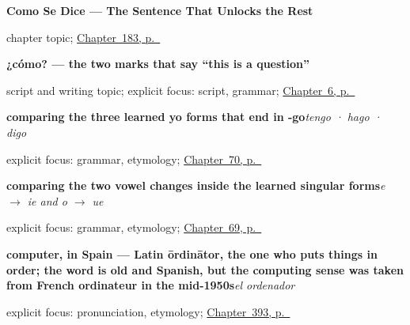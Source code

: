 \noindent\begin{minipage}[t]{\linewidth}
\raggedright
\textbf{Como Se Dice --- The Sentence That Unlocks the Rest}\par
\footnotesize chapter topic; \hyperref[ch:como-se-dice]{Chapter~183, p.~\pageref*{ch:como-se-dice}}
\end{minipage}\par\smallskip

\noindent\begin{minipage}[t]{\linewidth}
\raggedright
\textbf{¿cómo? — the two marks that say \textquotedblleft{}this is a question\textquotedblright{}}\par
\footnotesize script and writing topic; explicit focus: script, grammar; \hyperref[ch:asking-a-name]{Chapter~6, p.~\pageref*{ch:asking-a-name}}
\end{minipage}\par\smallskip

\noindent\begin{minipage}[t]{\linewidth}
\raggedright
\textbf{comparing the three learned yo forms that end in -go}\enspace\emph{tengo · hago · digo}\par
\footnotesize explicit focus: grammar, etymology; \hyperref[ch:yo-go-verbs]{Chapter~70, p.~\pageref*{ch:yo-go-verbs}}
\end{minipage}\par\smallskip

\noindent\begin{minipage}[t]{\linewidth}
\raggedright
\textbf{comparing the two vowel changes inside the learned singular forms}\enspace\emph{e $\to$ ie and o $\to$ ue}\par
\footnotesize explicit focus: grammar, etymology; \hyperref[ch:stem-changes]{Chapter~69, p.~\pageref*{ch:stem-changes}}
\end{minipage}\par\smallskip

\noindent\begin{minipage}[t]{\linewidth}
\raggedright
\textbf{computer, in Spain — Latin ōrdinātor, the one who puts things in order; the word is old and Spanish, but the computing sense was taken from French ordinateur in the mid-1950s}\enspace\emph{el ordenador}\par
\footnotesize explicit focus: pronunciation, etymology; \hyperref[ch:el-ordenador-y-el-correo-electronico]{Chapter~393, p.~\pageref*{ch:el-ordenador-y-el-correo-electronico}}
\end{minipage}\par\smallskip

